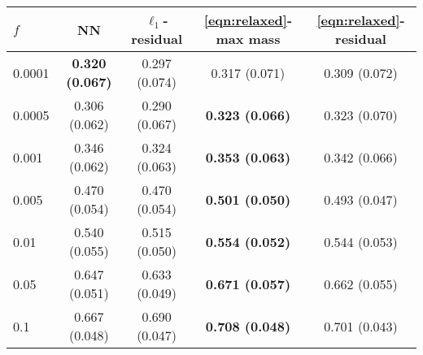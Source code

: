 \begin{tabular}{|l||c|c|c|c|}
\hline
$f$ & NN & $\ell_1$-residual & \eqref{eqn:relaxed}-max mass & \eqref{eqn:relaxed}-residual \\
\hline\hline
0.0001 & \textbf{0.320 (0.067)} & 0.297 (0.074) & 0.317 (0.071) & 0.309 (0.072) \\
\hline
0.0005 & 0.306 (0.062) & 0.290 (0.067) & \textbf{0.323 (0.066)} & 0.323 (0.070) \\
\hline
0.001 & 0.346 (0.062) & 0.324 (0.063) & \textbf{0.353 (0.063)} & 0.342 (0.066) \\
\hline
0.005 & 0.470 (0.054) & 0.470 (0.054) & \textbf{0.501 (0.050)} & 0.493 (0.047) \\
\hline
0.01 & 0.540 (0.055) & 0.515 (0.050) & \textbf{0.554 (0.052)} & 0.544 (0.053) \\
\hline
0.05 & 0.647 (0.051) & 0.633 (0.049) & \textbf{0.671 (0.057)} & 0.662 (0.055) \\
\hline
0.1 & 0.667 (0.048) & 0.690 (0.047) & \textbf{0.708 (0.048)} & 0.701 (0.043) \\
\hline
\end{tabular}